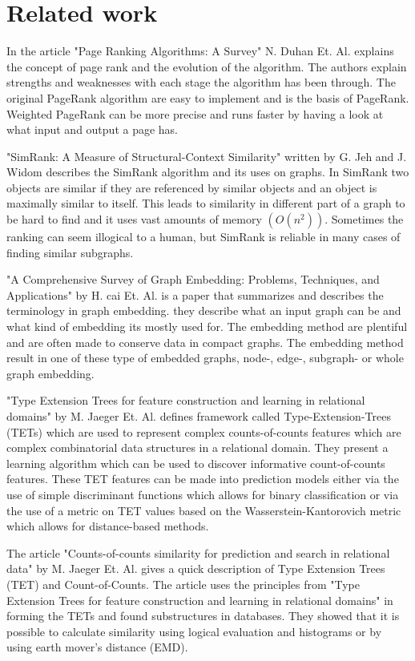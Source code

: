 \section{Related work}
In the article "Page Ranking Algorithms: A Survey" N. Duhan Et. Al.\cite{4809246} explains the concept of page rank and the evolution of the algorithm. The authors explain strengths and weaknesses with each stage the algorithm has been through. The original PageRank algorithm are easy to implement and is the basis of PageRank. Weighted PageRank can be more precise and runs faster by having a look at what input and output a page has.

"SimRank: A Measure of Structural-Context Similarity" written by G. Jeh and J. Widom\cite{10.1145/775047.775126} describes the SimRank algorithm and its uses on graphs. In SimRank two objects are similar if they are referenced by similar objects and an object is maximally similar to itself. This leads to similarity in different part of a graph to be hard to find and it uses vast amounts of memory $(O(n^2))$. Sometimes the ranking can seem illogical to a human, but SimRank is reliable in many cases of finding similar subgraphs.

"A Comprehensive Survey of Graph Embedding: Problems, Techniques, and Applications" by H. cai Et. Al.\cite{8294302} is a paper that summarizes and describes the terminology in graph embedding. they describe what an input graph can be and what kind of embedding its mostly used for. The embedding method are plentiful and are often made to conserve data in compact graphs. The embedding method result in one of these type of embedded graphs, node-, edge-, subgraph- or whole graph embedding.

"Type Extension Trees for feature construction and learning in relational domains" by M. Jaeger Et. Al. \cite{JAEGER201330} defines framework called Type-Extension-Trees (TETs) which are used to represent complex counts-of-counts features which are complex combinatorial data structures in a relational domain. They present a learning algorithm which can be used to discover informative count-of-counts features. These TET features can be made into prediction models either via the use of simple discriminant functions which allows for binary classification or via the use of a metric on TET values based on the Wasserstein-Kantorovich metric which allows for distance-based methods.

The article "Counts-of-counts similarity for prediction and search in relational data" by M. Jaeger Et. Al.\cite{jaeger2019counts}  gives a quick description of Type Extension Trees (TET) and Count-of-Counts. The article uses the principles from "Type Extension Trees for feature construction and learning in relational domains" in forming the TETs and found substructures in databases. They showed that it is possible to calculate similarity using logical evaluation and histograms or by using earth mover's distance (EMD).

